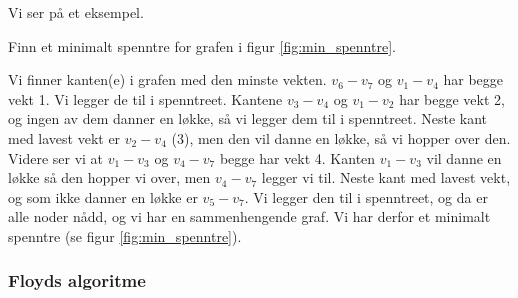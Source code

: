 \noindent Vi ser på et eksempel.

\begin{eks} Finn et minimalt spenntre for grafen i figur \ref{fig:min_spenntre}.

Vi finner kanten(e) i grafen med den minste vekten. $ v_6-v_7 $ og $ v_1-v_4 $ har begge vekt 1. Vi legger de til i spenntreet. Kantene $ v_3-v_4 $ og $ v_1-v_2 $ har begge vekt 2, og ingen av dem danner en løkke, så vi legger dem til i spenntreet. Neste kant med lavest vekt er $ v_2-v_4 $ (3), men den vil danne en løkke, så vi hopper over den. Videre ser vi at $ v_1-v_3 $ og $ v_4-v_7 $ begge har vekt 4. Kanten $ v_1-v_3 $ vil danne en løkke så den hopper vi over, men $ v_4-v_7 $ legger vi til. Neste kant med lavest vekt, og som ikke danner en løkke er $ v_5-v_7 $. Vi legger den til i spenntreet, og da er alle noder nådd, og vi har en sammenhengende graf. Vi har derfor et minimalt spenntre (se figur \ref{fig:min_spenntre}). 
\end{eks}


\subsubsection{\color{red}Floyds algoritme}
\label{floyd}